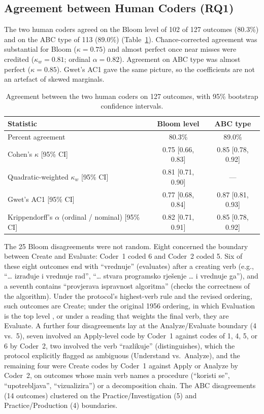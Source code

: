 \documentclass[journal,article,submit,pdftex,moreauthors]{Definitions/mdpi}
\begin{document}
\subsection{Agreement between Human Coders (RQ1)}
\label{sec:res_human}

The two human coders agreed on the Bloom level of 102 of 127 outcomes (80.3\%) and on the ABC type of 113 (89.0\%) (Table~\ref{tab:human}). Chance-corrected agreement was substantial for Bloom ($\kappa = 0.75$) and almost perfect once near misses were credited ($\kappa_w = 0.81$; ordinal $\alpha = 0.82$). Agreement on ABC type was almost perfect ($\kappa = 0.85$). Gwet's AC1 gave the same picture, so the coefficients are not an artefact of skewed marginals.

\begin{table}[H]
\caption{Agreement between the two human coders on 127 outcomes, with 95\% bootstrap confidence intervals.}
\label{tab:human}
\centering
\footnotesize
\begin{tabular}{lcc}
\toprule
\textbf{Statistic} & \textbf{Bloom level} & \textbf{ABC type} \\
\midrule
Percent agreement & 80.3\% & 89.0\% \\
Cohen's $\kappa$ [95\% CI] & 0.75 [0.66, 0.83] & 0.85 [0.78, 0.92] \\
Quadratic-weighted $\kappa_w$ [95\% CI] & 0.81 [0.71, 0.90] & --- \\
Gwet's AC1 [95\% CI] & 0.77 [0.68, 0.84] & 0.87 [0.81, 0.93] \\
Krippendorff's $\alpha$ (ordinal / nominal) [95\% CI] & 0.82 [0.71, 0.91] & 0.85 [0.78, 0.92] \\
\bottomrule
\end{tabular}
\end{table}

The 25 Bloom disagreements were not random. Eight concerned the boundary between Create and Evaluate: Coder~1 coded 6 and Coder~2 coded 5. Six of these eight outcomes end with ``vrednuje'' (evaluates) after a creating verb (e.g., ``\ldots{} izrađuje i vrednuje rad'', ``\ldots{} stvara programsko rješenje \ldots{} i vrednuje ga''), and a seventh contains ``provjerava ispravnost algoritma'' (checks the correctness of the algorithm). Under the protocol's highest-verb rule and the revised ordering, such outcomes are Create; under the original 1956 ordering, in which Evaluation is the top level \cite{bloom_1956}, or under a reading that weights the final verb, they are Evaluate. A further four disagreements lay at the Analyze/Evaluate boundary (4 vs.\ 5), seven involved an Apply-level code by Coder~1 against codes of 1, 4, 5, or 6 by Coder~2, two involved the verb ``razlikuje'' (distinguishes), which the protocol explicitly flagged as ambiguous (Understand vs.\ Analyze), and the remaining four were Create codes by Coder~1 against Apply or Analyze by Coder~2, on outcomes whose main verb names a procedure (``koristi se'', ``upotrebljava'', ``vizualizira'') or a decomposition chain. The ABC disagreements (14 outcomes) clustered on the Practice/Investigation (5) and Practice/Production (4) boundaries.
\end{document}

